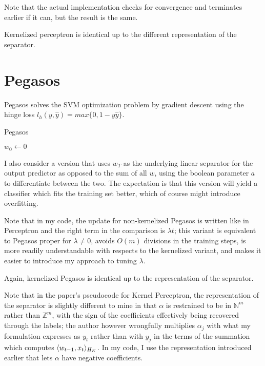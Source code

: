 Note that the actual implementation checks for convergence and terminates earlier if it can, but the result is the same.

Kernelized perceptron is identical up to the different representation of the separator.

\section{Pegasos}
Pegasos solves the SVM optimization problem by gradient descent using the hinge loss $l_h(y, \hat{y}) = max \{ 0, 1 - y\hat{y} \}$.

\begin{algorithm}[H]
    \caption{Pegasos}
    $w_0 \gets{} 0$\;
\end{algorithm}

I also consider a version that uses $w_T$ as the underlying linear separator for the output predictor as opposed to the sum of all $w$, using the boolean parameter ${a}$ to differentiate between the two. The expectation is that this version will yield a classifier which fits the training set better, which of course might introduce overfitting.

Note that in my code, the update for non-kernelized Pegasos is written like in Perceptron and the right term in the comparison is $\lambda{}t$; this variant is equivalent to Pegasos proper for $\lambda{} \neq 0$, avoids $O(m)$ divisions in the training steps, is more readily understandable with respects to the kernelized variant, and makes it easier to introduce my approach to tuning $\lambda{}$.

Again, kernelized Pegasos is identical up to the representation of the separator.

Note that in the paper's pseudocode for Kernel Perceptron, the representation of the separator is slightly different to mine in that $\alpha{}$ is restrained to be in $\mathbb{N}^m$ rather than $\mathbb{Z}^m$, with the sign of the coefficients effectively being recovered through the labels; the author however wrongfully multiplies $\alpha{}_j$ with what my formulation expresses as $y_t$ rather than with $y_j$ in the terms of the summation which computes $\langle{} w_{t-1}, x_t \rangle{}_{H_K}$. In my code, I use the representation introduced earlier that lets $\alpha{}$ have negative coefficients.

